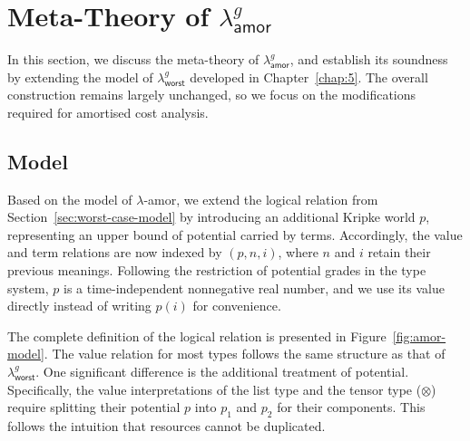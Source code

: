 \section{Meta-Theory of $\lambda^g_{\mathsf{amor}}$}
\label{sec:amor-model}
In this section, we discuss the meta-theory of $\lambda^g_{\mathsf{amor}}$, and establish its soundness
by extending the model of $\lambda^g_{\mathsf{worst}}$ developed in Chapter~\ref{chap:5}.
The overall construction remains largely unchanged, so we focus on the modifications required for amortised cost analysis.

\subsection{Model}
Based on the model of $\lambda$-amor, we extend the logical relation from Section~\ref{sec:worst-case-model} by introducing an additional Kripke world $p$, representing 
an upper bound of potential carried by terms. Accordingly, the value and term relations are now indexed by $(p,n, i)$, where $n$ and $i$ retain their previous meanings.
Following the restriction of potential grades in the type system, $p$ is a time-independent nonnegative real number, and we use its value directly 
instead of writing $p(i)$ for convenience.

The complete definition of the logical relation is presented in Figure~\ref{fig:amor-model}. The value relation for
most types follows the same structure as that of $\lambda^g_{\mathsf{worst}}$. One significant difference is the additional treatment 
of potential. Specifically, the value interpretations of the list type and the tensor type ($\otimes$) require splitting 
their potential $p$ into $p_1$ and $p_2$ for their components. This follows the intuition that resources cannot be duplicated.

